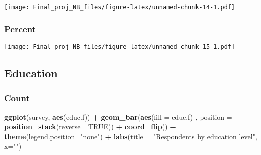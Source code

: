 \documentclass[]{article}
\newenvironment{Shaded}{\begin{snugshade}}{\end{snugshade}}
\newcommand{\KeywordTok}[1]{\textcolor[rgb]{0.13,0.29,0.53}{\textbf{#1}}}
\newcommand{\DataTypeTok}[1]{\textcolor[rgb]{0.13,0.29,0.53}{#1}}
\newcommand{\DecValTok}[1]{\textcolor[rgb]{0.00,0.00,0.81}{#1}}
\newcommand{\StringTok}[1]{\textcolor[rgb]{0.31,0.60,0.02}{#1}}
\newcommand{\OtherTok}[1]{\textcolor[rgb]{0.56,0.35,0.01}{#1}}
\newcommand{\ControlFlowTok}[1]{\textcolor[rgb]{0.13,0.29,0.53}{\textbf{#1}}}
\newcommand{\OperatorTok}[1]{\textcolor[rgb]{0.81,0.36,0.00}{\textbf{#1}}}
\newcommand{\NormalTok}[1]{#1}
\begin{document}
\texttt{[image: Final\_proj\_NB\_files/figure-latex/unnamed-chunk-14-1.pdf]}

\subsubsection{Percent}\label{percent}

\begin{Shaded}
\end{Shaded}

\texttt{[image: Final\_proj\_NB\_files/figure-latex/unnamed-chunk-15-1.pdf]}

\subsection{Education}\label{education}

\subsubsection{Count}\label{count-4}

\begin{Shaded}
\begin{Highlighting}[]
\KeywordTok{ggplot}\NormalTok{(survey, }\KeywordTok{aes}\NormalTok{(educ.f)) }\OperatorTok{+}
\StringTok{  }\KeywordTok{geom_bar}\NormalTok{(}\KeywordTok{aes}\NormalTok{(}\DataTypeTok{fill =}\NormalTok{ educ.f) , }\DataTypeTok{position =} \KeywordTok{position_stack}\NormalTok{(}\DataTypeTok{reverse =}\OtherTok{TRUE}\NormalTok{)) }\OperatorTok{+}
\StringTok{  }\KeywordTok{coord_flip}\NormalTok{() }\OperatorTok{+}\StringTok{ }\KeywordTok{theme}\NormalTok{(}\DataTypeTok{legend.position=}\StringTok{"none"}\NormalTok{) }\OperatorTok{+}\StringTok{ }
\StringTok{  }\KeywordTok{labs}\NormalTok{(}\DataTypeTok{title =} \StringTok{"Respondents by education level"}\NormalTok{, }\DataTypeTok{x=}\StringTok{""}\NormalTok{)}
\end{Highlighting}
\end{Shaded}
\end{document}
